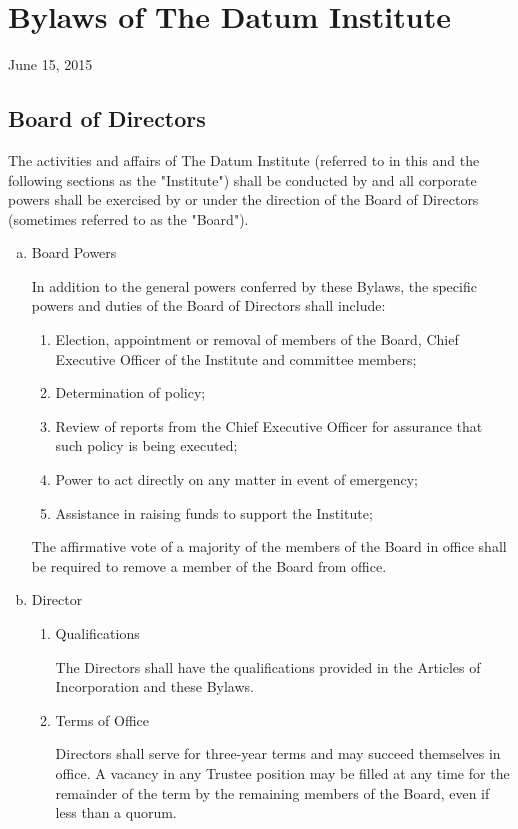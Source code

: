 \section{Bylaws of The Datum Institute}

June 15, 2015

\subsection{Board of Directors}

The activities and affairs of The Datum Institute (referred to in this and the following sections as the "Institute") shall be conducted by and all corporate powers shall be exercised by or under the direction of the Board of Directors (sometimes referred to as the "Board"). 

\begin{enumerate}[(a)]
\item Board Powers

In addition to the general powers conferred by these Bylaws, the specific powers and duties of the Board of Directors shall include:

\begin{enumerate}
\item Election, appointment or removal of members of the Board, Chief Executive Officer of the Institute and committee members; 
\item Determination of policy;
\item Review of reports from the Chief Executive Officer for assurance that such policy is being executed;
\item Power to act directly on any matter in event of emergency;
\item Assistance in raising funds to support the Institute;
\end{enumerate}

The affirmative vote of a majority of the members of the Board in office shall be required to remove a member of the Board from office.

\item Director

\begin{enumerate}
\item Qualifications

The Directors shall have the qualifications provided in the Articles of Incorporation and these Bylaws. 

\item Terms of Office

Directors shall serve for three-year terms and may succeed themselves in office.  A vacancy in any Trustee position may be filled at any time for the remainder of the term by the remaining members of the Board, even if less than a quorum.

\end{enumerate}

\end{enumerate}

